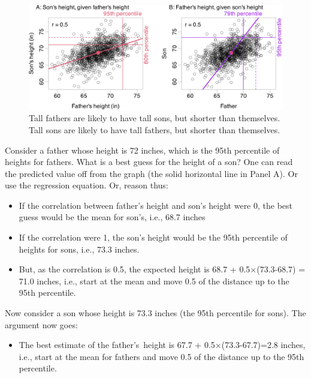 \documentclass[
  10pt,
  b5paper]{book}
\providecommand{\tightlist}{%
  \setlength{\itemsep}{0pt}\setlength{\parskip}{0pt}}
\begin{document}
\begin{figure}[H]

{\centering \includegraphics[width=1\linewidth]{07-regress_files/figure-latex/pearson-1} 

}

\caption{Tall fathers are likely to have tall sons, but shorter than themselves. 
Tall sons are likely to have tall fathers, but shorter than themselves.}\label{fig:pearson}
\end{figure}

Consider a father whose height is 72 inches, which is the 95th percentile of heights for fathers. What is a best guess for the height of a son? One can read the predicted value off from the graph (the solid horizontal line in Panel A). Or use the regression equation. Or, reason thus:

\begin{itemize}
\tightlist
\item
  If the correlation between father's height and son's height were 0, the best guess would be the mean for son's, i.e., 68.7 inches
\item
  If the correlation were 1, the son's height would be the 95th percentile of heights for sons, i.e., 73.3 inches.
\item
  But, as the correlation is 0.5, the expected height is 68.7 + 0.5\(\times\)(73.3-68.7) = 71.0 inches, i.e., start at the mean and move 0.5 of the distance up to the 95th percentile.
\end{itemize}

Now consider a son whose height is 73.3 inches (the 95th percentile for sons). The argument now goes:

\begin{itemize}
\tightlist
\item
  The best estimate of the father's~height is 67.7 + 0.5\(\times\)(73.3-67.7)=2.8 inches, i.e., start at the mean for fathers and move 0.5 of the distance up to the 95th percentile.
\end{itemize}
\end{document}
